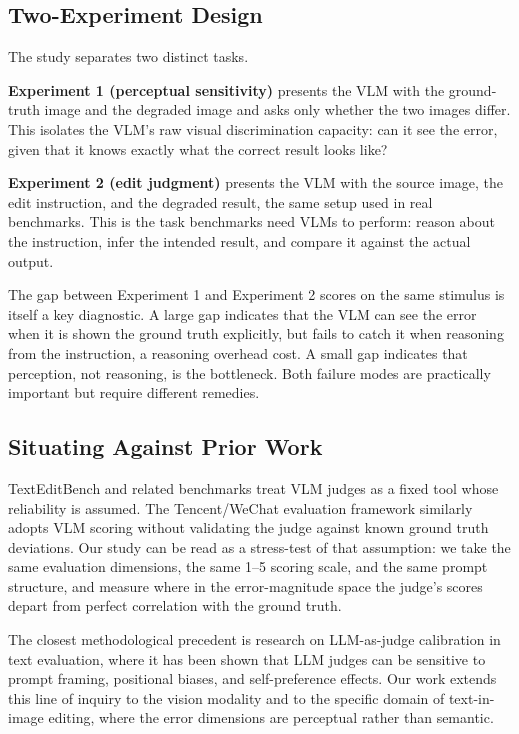 \subsection{Two-Experiment Design}

The study separates two distinct tasks.

\textbf{Experiment 1 (perceptual sensitivity)} presents the VLM with the ground-truth image and the degraded image and asks only whether the two images differ. This isolates the VLM's raw visual discrimination capacity: can it see the error, given that it knows exactly what the correct result looks like?

\textbf{Experiment 2 (edit judgment)} presents the VLM with the source image, the edit instruction, and the degraded result, the same setup used in real benchmarks. This is the task benchmarks need VLMs to perform: reason about the instruction, infer the intended result, and compare it against the actual output.

The gap between Experiment 1 and Experiment 2 scores on the same stimulus is itself a key diagnostic. A large gap indicates that the VLM can see the error when it is shown the ground truth explicitly, but fails to catch it when reasoning from the instruction, a reasoning overhead cost. A small gap indicates that perception, not reasoning, is the bottleneck. Both failure modes are practically important but require different remedies.

\subsection{Situating Against Prior Work}

TextEditBench and related benchmarks treat VLM judges as a fixed tool whose reliability is assumed. The Tencent/WeChat evaluation framework similarly adopts VLM scoring without validating the judge against known ground truth deviations. Our study can be read as a stress-test of that assumption: we take the same evaluation dimensions, the same 1--5 scoring scale, and the same prompt structure, and measure where in the error-magnitude space the judge's scores depart from perfect correlation with the ground truth.

The closest methodological precedent is research on LLM-as-judge calibration in text evaluation, where it has been shown that LLM judges can be sensitive to prompt framing, positional biases, and self-preference effects. Our work extends this line of inquiry to the vision modality and to the specific domain of text-in-image editing, where the error dimensions are perceptual rather than semantic.



